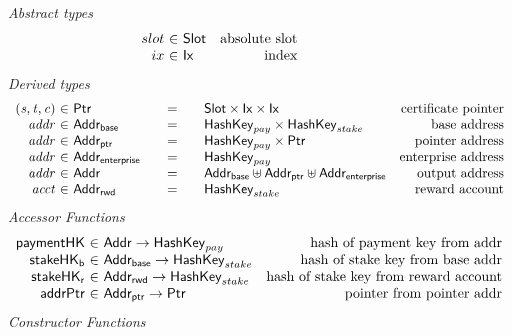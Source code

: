 \begin{figure*}[hbt]
  \emph{Abstract types}
  \begin{equation*}
    \begin{array}{r@{~\in~}lr}
      slot & \Slot & \text{absolute slot}\\
      ix & \Ix & \text{index}\\
    \end{array}
  \end{equation*}
  \emph{Derived types}
  \begin{equation*}
    \begin{array}{r@{~\in~}l@{\qquad=\qquad}lr}
      \var{(s,t,c)}
      & \Ptr
      & \Slot\times\Ix\times\Ix
      & \text{certificate pointer}
      \\
      \var{addr}
      & \AddrB
      & \HashKey_{pay}\times\HashKey_{stake}
      & \text{base address}
      \\
      \var{addr}
      & \AddrP
      & \HashKey_{pay}\times\Ptr
      & \text{pointer address}
      \\
      \var{addr}
      & \AddrE
      & \HashKey_{pay}
      & \text{enterprise address}
      \\
      \var{addr}
      & \Addr
      & \AddrB \uniondistinct \AddrP \uniondistinct \AddrE
      & \text{output address}
      \\
      \var{acct}
      & \AddrRWD
      & \HashKey_{stake}
      & \text{reward account}
      \\
    \end{array}
  \end{equation*}
  \emph{Accessor Functions}
  \begin{equation*}
    \begin{array}{r@{~\in~}lr}
      \fun{paymentHK} & \Addr \to \HashKey_{pay}
                      & \text{hash of payment key from addr}\\
      \fun{stakeHK_b} & \AddrB \to \HashKey_{stake}
                      & \text{hash of stake key from base addr}\\
      \fun{stakeHK_r} & \AddrRWD \to \HashKey_{stake}
                      & \text{hash of stake key from reward account}\\
      \fun{addrPtr} & \AddrP \to \Ptr
                    & \text{pointer from pointer addr}\\
    \end{array}
  \end{equation*}
  \emph{Constructor Functions}

\end{figure*}

